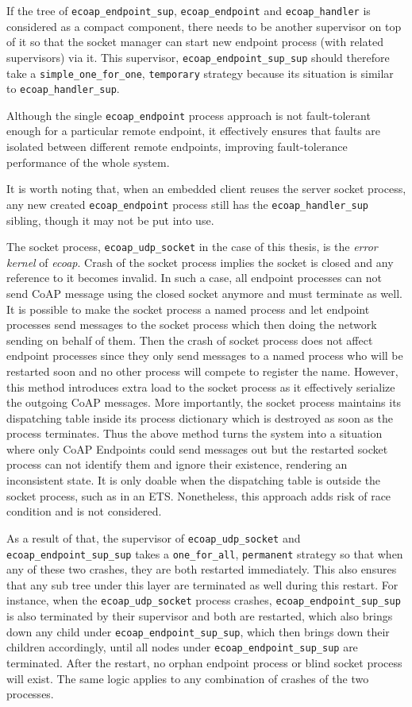 If the tree of \verb|ecoap_endpoint_sup|, \verb|ecoap_endpoint| and \verb|ecoap_handler| is considered as a compact component, there needs to be another supervisor on top of it so that the socket manager can start new endpoint process (with related supervisors) via it. This supervisor, \verb|ecoap_endpoint_sup_sup| should therefore take a \verb|simple_one_for_one|, \verb|temporary| strategy because its situation is similar to \verb|ecoap_handler_sup|. 

Although the single \verb|ecoap_endpoint| process approach is not fault-tolerant enough for a particular remote endpoint, it effectively ensures that faults are isolated between different remote endpoints, improving fault-tolerance performance of the whole system. 

It is worth noting that, when an embedded client reuses the server socket process, any new created \verb|ecoap_endpoint| process still has the \verb|ecoap_handler_sup| sibling, though it may not be put into use. 

The socket process, \verb|ecoap_udp_socket| in the case of this thesis, is the \textit{error kernel} of \textit{ecoap}. Crash of the socket process implies the socket is closed and any reference to it becomes invalid. In such a case, all endpoint processes can not send CoAP message using the closed socket anymore and must terminate as well. It is possible to make the socket process a named process and let endpoint processes send messages to the socket process which then doing the network sending on behalf of them. Then the crash of socket process does not affect endpoint processes since they only send messages to a named process who will be restarted soon and no other process will compete to register the name. However, this method introduces extra load to the socket process as it effectively serialize the outgoing CoAP messages. More importantly, the socket process maintains its dispatching table inside its process dictionary which is destroyed as soon as the process terminates. Thus the above method turns the system into a situation where only CoAP Endpoints could send messages out but the restarted socket process can not identify them and ignore their existence, rendering an inconsistent state. It is only doable when the dispatching table is outside the socket process, such as in an ETS. Nonetheless, this approach adds risk of race condition and is not considered. 

As a result of that, the supervisor of \verb|ecoap_udp_socket| and \verb|ecoap_endpoint_sup_sup| takes a \verb|one_for_all|, \verb|permanent| strategy so that when any of these two crashes, they are both restarted immediately. This also ensures that any sub tree under this layer are terminated as well during this restart. For instance, when the \verb|ecoap_udp_socket| process crashes, \verb|ecoap_endpoint_sup_sup| is also terminated by their supervisor and both are restarted, which also brings down any child under \verb|ecoap_endpoint_sup_sup|, which then brings down their children accordingly, until all nodes under \verb|ecoap_endpoint_sup_sup| are terminated. After the restart, no orphan endpoint process or blind socket process will exist. The same logic applies to any combination of crashes of the two processes. 

